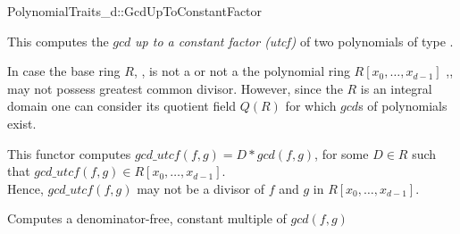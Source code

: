 \begin{ccRefConcept}{PolynomialTraits_d::GcdUpToConstantFactor}

\ccDefinition

This  computes the $gcd$  
{\em up to a constant factor (utcf)} of two polynomials of type 
. 

In case the base ring $R$, , 
is not a  or not a  the polynomial ring 
$R[x_0,\dots,x_{d-1}]$ ,, may not 
possess greatest common divisor. However, since the $R$ is an integral 
domain one can consider its quotient field $Q(R)$ for which $gcd$s of 
polynomials exist. 

This functor computes $gcd\_utcf(f,g) = D * gcd(f,g)$, 
for some $D \in R$ such that $gcd\_utcf(f,g) \in R[x_0,\dots,x_{d-1}]$.\\
Hence, $gcd\_utcf(f,g)$ may not be a divisor of $f$ and $g$ in $R[x_0,\dots,x_{d-1}]$.

\ccRefines 


\ccTypes


\ccGlue
{}\ccGlue
{}

\ccOperations

                {Computes a denominator-free, constant multiple of $gcd(f,g)$}




\ccSeeAlso

\\
\\
\\
\\
\\

\end{ccRefConcept}